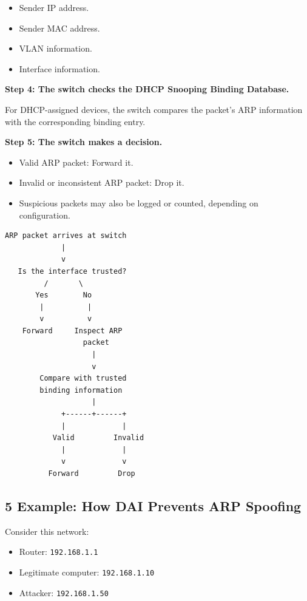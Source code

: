 \begin{itemize}
\item Sender IP address.
\item Sender MAC address.
\item VLAN information.
\item Interface information.
\end{itemize}

\textbf{Step 4: The switch checks the DHCP Snooping Binding Database.}

For DHCP-assigned devices, the switch compares the packet's ARP information with the corresponding binding entry.

\textbf{Step 5: The switch makes a decision.}

\begin{itemize}
\item Valid ARP packet: Forward it.
\item Invalid or inconsistent ARP packet: Drop it.
\item Suspicious packets may also be logged or counted, depending on configuration.
\end{itemize}

\begin{lstlisting}
ARP packet arrives at switch
             |
             v
   Is the interface trusted?
         /       \
       Yes        No
        |          |
        v          v
    Forward     Inspect ARP
                  packet
                    |
                    v
        Compare with trusted
        binding information
                    |
             +------+------+
             |             |
           Valid         Invalid
             |             |
             v             v
          Forward         Drop
\end{lstlisting}

\subsection{5 Example: How DAI Prevents ARP Spoofing}

Consider this network:

\begin{itemize}
\item Router: \texttt{192.168.1.1}
\item Legitimate computer: \texttt{192.168.1.10}
\item Attacker: \texttt{192.168.1.50}
\end{itemize}

